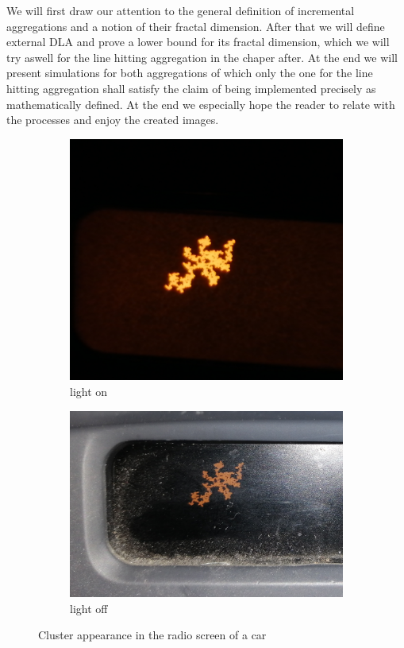 \documentclass[12pt,a4paper]{scrartcl}
\numberwithin{equation}{subsection}
\newcommand{\1}{\mathbbm{1}}
\numberwithin{equation}{section}
\theoremstyle{definition}
\begin{document}
	\noindent We will first draw our attention to the general definition of incremental aggregations and a notion of their fractal dimension. After that we will define external DLA and prove a lower bound for its fractal dimension, which we will try aswell for the line hitting aggregation in the chaper after. At the end we will present simulations for both aggregations of which only the one for the line hitting aggregation shall satisfy the claim of being implemented precisely as mathematically defined. At the end we especially hope the reader to relate with the processes and enjoy the created images.
	
\begin{figure}
	\centering
	\begin{subfigure}[b]{.45\textwidth}
		\includegraphics[width=.9\linewidth]{images/display.jpg} 
		\caption{light on} 
	\end{subfigure}
	\begin{subfigure}[b]{.45\textwidth}
		\includegraphics[width=.9\linewidth]{images/display2.jpg}
		\caption{light off} 
	\end{subfigure}
	\caption{Cluster appearance in the radio screen of a car}
	\label{radio}
\end{figure}
\end{document}

